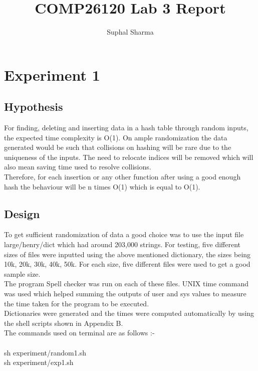 \documentclass[a4]{article}
\title{COMP26120 Lab 3 Report}
\author{Suphal Sharma}
\begin{document}
\maketitle

\section{Experiment 1}

\subsection{Hypothesis}

For finding, deleting and inserting data in a hash table through random inputs, the expected time complexity is O(1). On ample randomization the data generated would be such that collisions on hashing will be rare due to the uniqueness of the inputs. The need to relocate indices will be removed which will also mean saving time used to resolve collisions. \\

Therefore, for each insertion or any other function after using a good enough hash the behaviour will be n times O(1) which is equal to O(1). 


\subsection{Design}

To get sufficient randomization of data a good choice was to use the input file large/henry/dict which had around 203,000 strings. For testing, five different sizes of files were inputted using the above mentioned dictionary, the sizes being 10k, 20k, 30k, 40k, 50k. For each size, five different files were used to get a good sample size.\\

The program Spell checker was run on each of these files.
UNIX time command was used which helped summing the outputs of user and sys values to measure the time taken for the program to be executed. \\

Dictionaries were generated and the times were computed automatically by using the shell scripts shown in Appendix B. \\

The commands used on terminal are as follows :- \\
\\
sh experiment/random1.sh \\
sh experiment/exp1.sh \\
\end{document}
